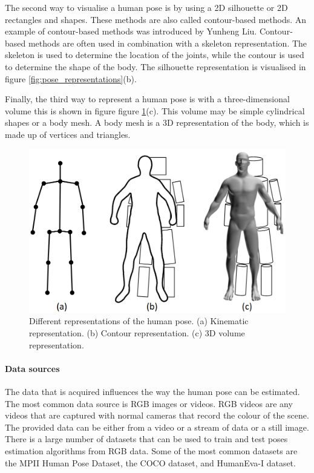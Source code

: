 The second way to visualise a human pose is by using a 2D silhouette or 2D rectangles and shapes. These methods are also called contour-based methods. An example of contour-based methods was introduced by Yunheng Liu\cite{contourHPE}. Contour-based methods are often used in combination with a skeleton representation. The skeleton is used to determine the location of the joints, while the contour is used to determine the shape of the body. The silhouette representation is visualised in figure \ref{fig:pose_representations}(b).

Finally, the third way to represent a human pose is with a three-dimensional volume this is shown in figure figure \ref{fig:pose_representation}(c). This volume may be simple cylindrical shapes or a body mesh. A body mesh is a 3D representation of the body, which is made up of vertices and triangles.

\begin{figure}[ht]
    \centering
    \includegraphics[width=0.8\linewidth]{figures/HPE/PoseRepresentation.png}
    \caption[Different representations of the human pose]{Different representations of the human pose. (a) Kinematic representation. (b) Contour representation. (c) 3D volume representation. \cite{HPESurveyOriginal}}
    \label{fig:pose_representation}
\end{figure}

\paragraph{Data sources}

The data that is acquired influences the way the human pose can be estimated. The most common data source is RGB images or videos. RGB videos are any videos that are captured with normal cameras that record the colour of the scene. The provided data can be either from a video or a stream of data or a still image. There is a large number of datasets that can be used to train and test poses estimation algorithms from RGB data. Some of the most common datasets are the MPII Human Pose Dataset\cite{MPII}, the COCO dataset\cite{Coco}, and HumanEva-I dataset\cite{HumanEva}.

